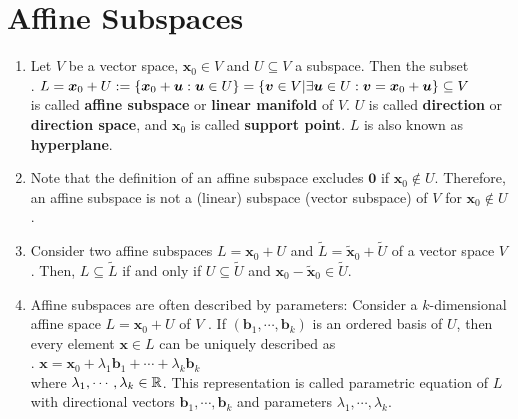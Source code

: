 \section{Affine Subspaces}

\begin{enumerate}
    \item
    \begin{definition}
        Let $V$ be a vector space, $\bm{x}_0 \in V$ and $U \subseteq V$ a subspace.
        Then the subset
        \hfill \cite{mfml/book/mml/Deisenroth-Faisal-Ong}
        \\
        .\hfill
        $
            L
            = \bm{x}_0 + U
            := \left\{\bm{x}_0 + \bm{u} : \bm{u} \in  U\right\}
            = \left\{\bm{v} \in  V | \exists \bm{u} \in  U : \bm{v} = \bm{x}_0 + \bm{u}\right\} \subseteq V
        $
        \hfill \cite{mfml/book/mml/Deisenroth-Faisal-Ong}
        \\
        is called \textbf{affine subspace} or \textbf{linear manifold} of $V$.
        $U$ is called \textbf{direction} or \textbf{direction space}, and $\bm{x}_0$ is called \textbf{support point}.
        $L$ is also known as \textbf{hyperplane}.
        \hfill \cite{mfml/book/mml/Deisenroth-Faisal-Ong}
    \end{definition}

    \item Note that the definition of an affine subspace excludes $\bm{0}$ if $\bm{x}_0 \notin U$.
    Therefore, an affine subspace is not a (linear) subspace (vector subspace) of $V$ for $\bm{x}_0 \notin U$.
    \hfill \cite{mfml/book/mml/Deisenroth-Faisal-Ong}

    \item Consider two affine subspaces $L = \bm{x}_0 + U$ and $\tilde{L} = \tilde{\bm{x}}_0 + \tilde{U}$ of a vector space $V$ .
    Then, $L \subseteq \tilde{L}$ if and only if $U \subseteq \tilde{U}$ and $\bm{x}_0 - \tilde{\bm{x}}_0 \in \tilde{U}$.
    \hfill \cite{mfml/book/mml/Deisenroth-Faisal-Ong}

    \item Affine subspaces are often described by parameters: Consider a $k$-dimensional affine space $L = \bm{x}_0 + U$ of $V$ .
    If $(\bm{b}_1, \cdots , \bm{b}_k)$ is an ordered basis of $U$, then every element $\bm{x} \in L$ can be uniquely described as
    \hfill \cite{mfml/book/mml/Deisenroth-Faisal-Ong}
    \\
    .\hfill
    $
        \bm{x} = \bm{x}_0 + \lambda _1 \bm{b}_1 + \cdots + \lambda _k \bm{b}_k
    $
    \hfill \cite{mfml/book/mml/Deisenroth-Faisal-Ong}
    \\
    where $\lambda _1, \cdots , \lambda _k \in \mathbb{R}$.
    This representation is called parametric equation of $L$ with directional vectors $\bm{b}_1, \cdots , \bm{b}_k$ and parameters $\lambda _1, \cdots , \lambda _k$.
    \hfill \cite{mfml/book/mml/Deisenroth-Faisal-Ong}


\end{enumerate}
